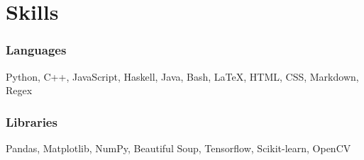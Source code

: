 \documentclass{article}
\makeatletter
\newcommand{\smallbullet}{\,\begin{picture}(-1,1)(-1,-3)\circle*{3}\end{picture}\ }
\newenvironment{resumeItem}
{
    \vspace{0.5em}
}
{
}
\newcommand{\experienceHead}[4]{
    \textbf{#1} @ #2 \hfill #3 \\[-1.2em]
}
\newenvironment{resumeList}
{
    \begin{itemize}[label=\smallbullet]
}
{
    \end{itemize}
}
\makeatother
\begin{document}




\section{Skills}

\begin{resumeItem}
\subsubsection{Languages}
Python, C++, JavaScript, Haskell, Java, Bash, {\LaTeX}, HTML, CSS, Markdown, Regex

\subsubsection{Libraries}
Pandas, Matplotlib, NumPy, Beautiful Soup, Tensorflow, Scikit-learn, OpenCV
\end{resumeItem}
\end{document}
